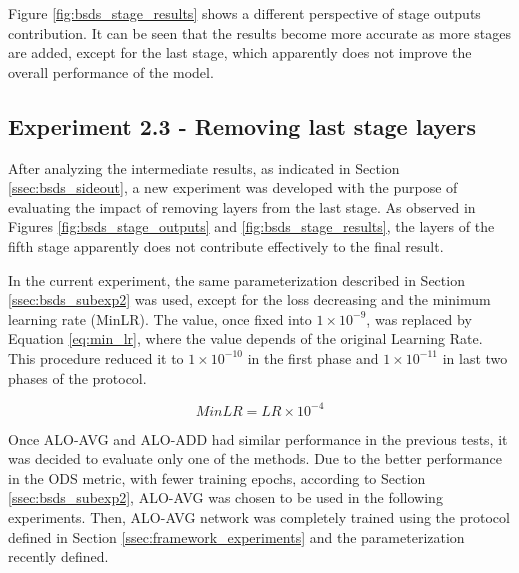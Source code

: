 
Figure \ref{fig:bsds_stage_results} shows a different perspective of stage outputs contribution.
It can be seen that the results become more accurate as more stages are added, except for the last stage, which apparently does not improve the overall performance of the model.

\subsection{Experiment 2.3 - Removing last stage layers}
\label{ssec:bsds_subexp3}

After analyzing the intermediate results, as indicated in Section \ref{ssec:bsds_sideout}, a new experiment was developed with the purpose of evaluating the impact of removing layers from the last stage.
As observed in Figures \ref{fig:bsds_stage_outputs} and \ref{fig:bsds_stage_results}, the layers of the fifth stage apparently does not contribute effectively to the final result.

In the current experiment, the same parameterization described in Section \ref{ssec:bsds_subexp2} was used, except for the loss decreasing and the minimum learning rate (MinLR).
The value, once fixed into $1 \times 10^{-9}$, was replaced by Equation \ref{eq:min_lr}, where the value depends of the original Learning Rate.
This procedure reduced it to $1 \times 10^{-10}$ in the first phase and $1 \times 10^{-11}$ in last two phases of the protocol.

\begin{equation}
  MinLR = LR \times 10^{-4}
  \label{eq:min_lr}
\end{equation}

Once ALO-AVG and ALO-ADD had similar performance in the previous tests, it was decided to evaluate only one of the methods.
Due to the better performance in the ODS metric, with fewer training epochs, according to Section \ref{ssec:bsds_subexp2}, ALO-AVG was chosen to be used in the following experiments.
Then, ALO-AVG network was completely trained using the protocol defined in Section \ref{ssec:framework_experiments} and the parameterization recently defined.

